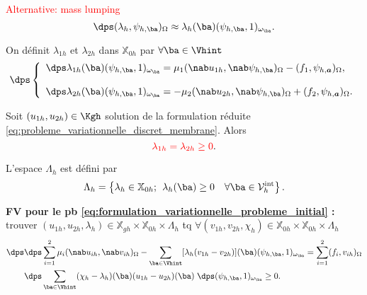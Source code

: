 \documentclass{beamer}
\begin{document}
\begin{frame} 
\textcolor{red}{Alternative: mass lumping} 
\begin{equation*}
\dps (\lambda_{h},\psi_{h,\ba})_{\Omega} \approx \lambda_h({\ba}) ( \psi_{h,\ba},1)_{\omega_{\ba}}.
\end{equation*}
\begin{definition}
On définit $\lambda_{1h}$ et $\lambda_{2h}$ dans $\mathbb{X}_{0h}$ par $\forall \ba \in \Vhint$
\begin{equation}
\dps
\left\lbrace\begin{array}{llccc}
\dps \lambda_{1h}({\ba}) (\psi_{h,\ba},1)_{\omega_{\ba}}=\mu_1 (\nab u_{1h}, \nab \psi_{h,\ba})_{\Omega}-(f_1, \psi_{h,\bm a})_{\Omega}, \\\\
\dps \lambda_{2h}({\ba}) (\psi_{h,\ba},1)_{\omega_{\ba}}=-\mu_2 (\nab u_{2h}, \nab \psi_{h,\ba})_{\Omega}+(f_2, \psi_{h,\bm a})_{\Omega}.
\end{array}
\right.
\label{eq:555}
\end{equation}
\end{definition}
\begin{proposition}
Soit $(u_{1h},u_{2h})\in \Kgh$ solution de la formulation réduite \eqref{eq:probleme_variationnelle_discret_membrane}. Alors
\begin{equation}
\textcolor{red}{
\lambda_{1h}=\lambda_{2h} \geq 0}.
\end{equation}
\end{proposition}
\end{frame}
\begin{frame}
\begin{definition}
L'espace $\Lambda_h$ est défini par
\begin{align}
\Lambda_h=\left\{\lambda_h \in \mathbb{X}_{0h}; \hspace{0.15 cm} \lambda_h({\ba}) \geq 0 \quad \forall {\ba}\in \mathcal{V}_h^{\mathrm{int}}\right\}.
\label{eq: defcone}
\end{align}
\end{definition}

\textbf{FV pour le pb \eqref{eq:formulation_variationnelle_probleme_initial} :} trouver $(u_{1h},u_{2h},\lambda_h)\in {\mathbb{X}}_{gh} \times {\mathbb{X}}_{0h} \times \Lambda_h$ tq $\forall (v_{1h},v_{2h},\chi_h)\in {\mathbb{X}}_{0h} \times {\mathbb{X}}_{0h}\times \Lambda_h$
\begin{align*}
\dps
&\dps \sum_{i=1}^2 \mu_i  (\nab u_{ih},\nab v_{ih})_{\Omega}-\sum_{{\ba}\in \Vhint}[\lambda_h(v_{1h}-v_{2h})]({\ba})(\psi_{h,\ba},1)_{\omega_{\ba}}= \sum_{i=1}^2  (f_i,v_{ih})_{\Omega} \\
&\dps \sum_{{\ba}\in \Vhint}(\chi_h-\lambda_h)({\ba})(u_{1h}-u_{2h})({\ba}) \hspace{0.1 cm}\dps (\psi_{h,\ba},1)_{\omega_{\ba}}\geq 0.
\end{align*}


\end{frame}
\end{document}
